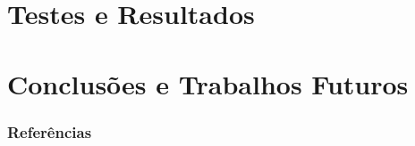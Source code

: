 	\section{Testes e Resultados}
		
		
		
			
		
	\section{Conclusões e Trabalhos Futuros}
		
	
	\begin{frame}[allowframebreaks]
		\frametitle{Referências}
		
	\end{frame}
	
